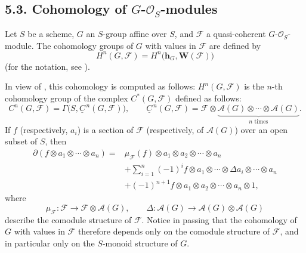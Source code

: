 \subsection*{5.3. Cohomology of \(G\)-\(\mathscr O_S\)-modules}

Let \(S\) be a scheme, \(G\) an \(S\)-group affine over \(S\), and
\(\mathscr F\) a quasi-coherent \(G\)-\(\mathscr O_S\)-module. The cohomology groups of
\(G\) with values in \(\mathscr F\) are defined by
\[
  H^n(G,\mathscr F)
    =H^n\bigl(\mathbf h_G,\mathbf W(\mathscr F)\bigr)
\]
(for the notation, see ).

In view of ,
this cohomology is computed as follows: \(H^n(G,\mathscr F)\) is the
\(n\)-th cohomology group of the complex \(C^*(G,\mathscr F)\) defined
as follows:
\[
  C^n(G,\mathscr F)=\Gamma\bigl(S,\underline C^{\,n}(G,\mathscr F)\bigr),
  \qquad
  \underline C^{\,n}(G,\mathscr F)
    =\mathscr F\otimes
       \underbrace{\mathscr A(G)\otimes\cdots\otimes\mathscr A(G)}_
                   {n\text{ times}}.
\]
If \(f\) (respectively, \(a_i\)) is a section of \(\mathscr F\)
(respectively, of \(\mathscr A(G)\)) over an open subset of \(S\), then
\begin{align*}
  \partial(f\otimes a_1\otimes\cdots\otimes a_n)
    ={}&\mu_{\mathscr F}(f)\otimes a_1\otimes a_2\otimes\cdots\otimes a_n\\
     &+\sum_{i=1}^{n}(-1)^i
       f\otimes a_1\otimes\cdots\otimes\Delta a_i\otimes\cdots\otimes a_n\\
     &+(-1)^{n+1}
       f\otimes a_1\otimes a_2\otimes\cdots\otimes a_n\otimes1,
\end{align*}
where
\[
  \mu_{\mathscr F}:\mathscr F\longrightarrow
    \mathscr F\otimes\mathscr A(G),
  \qquad
  \Delta:\mathscr A(G)\longrightarrow\mathscr A(G)\otimes\mathscr A(G)
\]
describe the comodule structure of \(\mathscr F\). Notice in passing that the cohomology of
\(G\) with values in \(\mathscr F\) therefore depends only on the
comodule structure of \(\mathscr F\), and in particular only on the
\(S\)-monoid structure of \(G\).

